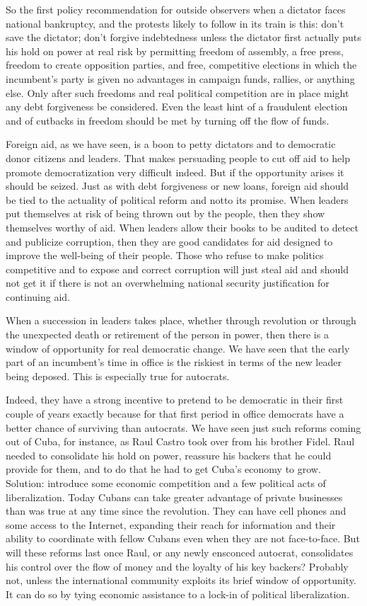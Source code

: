 \documentclass[10pt]{article}
\begin{document}
{\large So the first policy recommendation for outside observers when a dictator
faces national bankruptcy, and the protests likely to follow in its train is
this: don't save the dictator; don't forgive indebtedness unless the dictator
first actually puts his hold on power at real risk by permitting freedom of
assembly, a free press, freedom to create opposition parties, and free,
competitive elections in which the incumbent's party is given no advantages in
campaign funds, rallies, or anything else. Only after such freedoms and real
political competition are in place might any debt forgiveness be considered. Even
the least hint of a fraudulent election and of cutbacks in freedom should be met
by turning off the flow of funds.}

{\large Foreign aid, as we have seen, is a boon to petty dictators and to
democratic donor citizens and leaders. That makes persuading people to cut off
aid to help promote democratization very difficult indeed. But if the opportunity
arises it should be seized. Just as with debt forgiveness or new loans, foreign
aid should be tied to the actuality of political reform and notto its promise.
When leaders put themselves at risk of being thrown out by the people, then they
show themselves worthy of aid. When leaders allow their books to be audited to
detect and publicize corruption, then they are good candidates for aid designed
to improve the well-being of their people. Those who refuse to make politics
competitive and to expose and correct corruption will just steal aid and should
not get it if there is not an overwhelming national security justification for
continuing aid.}

{\large When a succession in leaders takes place, whether through revolution or
through the unexpected death or retirement of the person in power, then there is
a window of opportunity for real democratic change. We have seen that the early
part of an incumbent's time in office is the riskiest in terms of the new leader
being deposed. This is especially true for autocrats.}

{\large Indeed, they have a strong incentive to pretend to be democratic in
their first couple of years exactly because for that first period in office
democrats have a better chance of surviving than autocrats. We have seen just
such reforms coming out of Cuba, for instance, as Raul Castro took over from his
brother Fidel. Raul needed to consolidate his hold on power, reassure his backers
that he could provide for them, and to do that he had to get Cuba's economy to
grow. Solution: introduce some economic competition and a few political acts of
liberalization. Today Cubans can take greater advantage of private businesses
than was true at any time since the revolution. They can have cell phones and
some access to the Internet, expanding their reach for information and their
ability to coordinate with fellow Cubans even when they are not face-to-face. But
will these reforms last once Raul, or any newly ensconced autocrat, consolidates
his control over the flow of money and the loyalty of his key backers? Probably
not, unless the international community exploits its brief window of opportunity.
It can do so by tying economic assistance to a lock-in of political
liberalization.}
\end{document}
